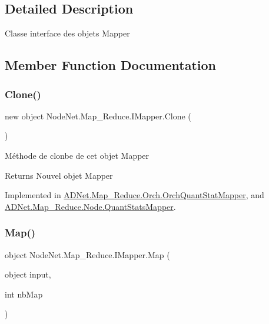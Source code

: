 \subsection{Detailed Description}
Classe interface des objets Mapper 



\subsection{Member Function Documentation}
\mbox{\label{interface_node_net_1_1_map___reduce_1_1_i_mapper_a8d322c9ffa12be02d65da6c8b8563c77}} 
\subsubsection{\texorpdfstring{Clone()}{Clone()}}
{\footnotesize\ttfamily new object Node\+Net.\+Map\+\_\+\+Reduce.\+I\+Mapper.\+Clone (\begin{DoxyParamCaption}{ }\end{DoxyParamCaption})}



Méthode de clonbe de cet objet Mapper 

\begin{DoxyReturn}{Returns}
Nouvel objet Mapper
\end{DoxyReturn}


Implemented in \hyperlink{class_a_d_net_1_1_map___reduce_1_1_orch_1_1_orch_quant_stat_mapper_ab19865558d09a6f567ccb318c5ed14d5}{A\+D\+Net.\+Map\+\_\+\+Reduce.\+Orch.\+Orch\+Quant\+Stat\+Mapper}, and \hyperlink{class_a_d_net_1_1_map___reduce_1_1_node_1_1_quant_stats_mapper_a8b49d45b5c0d2446323549f6716f5b45}{A\+D\+Net.\+Map\+\_\+\+Reduce.\+Node.\+Quant\+Stats\+Mapper}.

\mbox{\label{interface_node_net_1_1_map___reduce_1_1_i_mapper_ac25758a2753bdfdc9579d29b9a31fe73}} 
\subsubsection{\texorpdfstring{Map()}{Map()}}
{\footnotesize\ttfamily object Node\+Net.\+Map\+\_\+\+Reduce.\+I\+Mapper.\+Map (\begin{DoxyParamCaption}\item[{object}]{input,  }\item[{int}]{nb\+Map }\end{DoxyParamCaption})}



